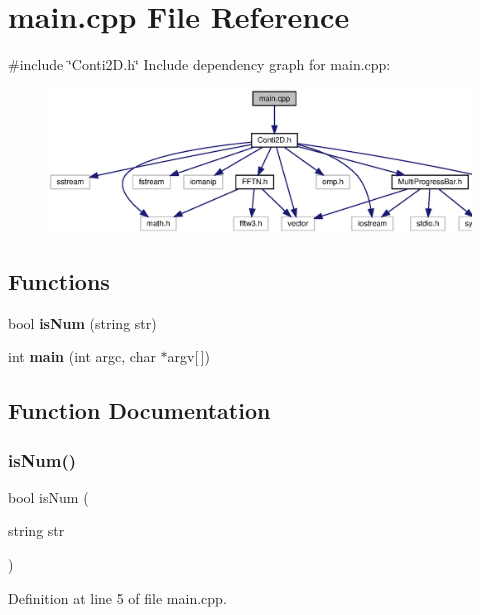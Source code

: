 \section{main.\+cpp File Reference}
\label{main_8cpp}
{\ttfamily \#include \char`\"{}Conti2\+D.\+h\char`\"{}}\newline
Include dependency graph for main.\+cpp\+:\nopagebreak
\begin{figure}[H]
\begin{center}
\leavevmode
\includegraphics[width=350pt]{main_8cpp__incl}
\end{center}
\end{figure}
\subsection*{Functions}
\begin{DoxyCompactItemize}
\item 
bool \textbf{ is\+Num} (string str)
\item 
int \textbf{ main} (int argc, char $\ast$argv[$\,$])
\end{DoxyCompactItemize}


\subsection{Function Documentation}
\mbox{\label{main_8cpp_adab29bff9da0db53a1c9a47fed7144bb_adab29bff9da0db53a1c9a47fed7144bb}} 
\subsubsection{is\+Num()}
{\footnotesize\ttfamily bool is\+Num (\begin{DoxyParamCaption}\item[{string}]{str }\end{DoxyParamCaption})}



Definition at line 5 of file main.\+cpp.



